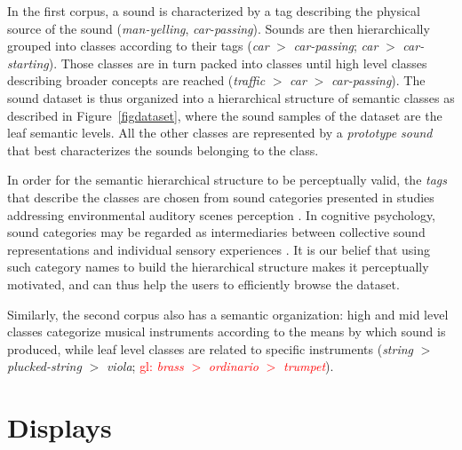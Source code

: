 \documentclass{aes2e}
\newcommand{\gl}[1]{\textcolor{red}{gl: #1}}
\begin{document}
In the first corpus, a sound is characterized by a tag describing the physical source of the sound (\textit{man-yelling}, \textit{car-passing}). Sounds are then hierarchically grouped into classes according to their tags (\textit{car} $>$ \textit{car-passing}; \textit{car} $>$ \textit{car-starting}). Those classes are in turn packed into classes until high level classes describing broader concepts are reached (\textit{traffic} $>$ \textit{car} $>$ \textit{car-passing}). The sound dataset is thus organized into a hierarchical structure of semantic classes as described in Figure~\ref{figdataset}, where the sound samples of the dataset are the leaf semantic levels. All the other classes are represented by a \textit{prototype sound} that best characterizes the sounds belonging to the class. 

In order for the semantic hierarchical structure to be perceptually valid, the \textit{tags} that describe the classes  are chosen from sound categories presented in studies addressing environmental auditory scenes perception \cite{niessen2010categories, brown2011towards, dubois2006cognitive}. In cognitive psychology, sound categories may be regarded as intermediaries between collective sound representations and individual sensory experiences \cite{dubois2006cognitive}. It is our belief that using such category names to build the hierarchical structure makes it perceptually motivated, and can thus help the users to efficiently browse the dataset.

Similarly, the second corpus also has a semantic organization: high and mid level classes categorize musical instruments according to the means by which sound is produced, while leaf level classes are related to specific instruments (\textit{string} $>$ \textit{plucked-string} $>$ \textit{viola}; \gl{\textit{brass} $>$ \textit{ordinario} $>$ \textit{trumpet}}).


\section{Displays} \label{display}
\end{document}
